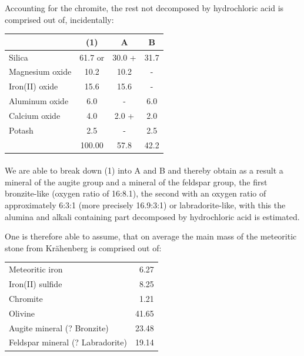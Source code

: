 \documentclass[a4paper, 12pt, oneside]{article}
\begin{document}
Accounting for the chromite, the rest not decomposed by hydrochloric acid is comprised out of, incidentally:
\begin{center}
    \begin{tabular}{ |l|c|c|c| }
        \hline
        & (1) & A & B\\\hline
        Silica & 61.7 or & 30.0 + & 31.7\\\hline
        Magnesium oxide & 10.2 & 10.2 & -\\\hline
        Iron(II) oxide & 15.6 & 15.6 & -\\\hline
        Aluminum oxide & 6.0 & - & 6.0\\\hline
        Calcium oxide & 4.0 & 2.0 + & 2.0\\\hline
        Potash & 2.5 & - & 2.5\\\hline
        & 100.00 & 57.8 & 42.2\\
        \hline
    \end{tabular}
\end{center}
\paragraph*{}
We are able to break down (1) into A and B and thereby obtain as a result a mineral of the augite group and a mineral of the feldspar group, the first bronzite-like (oxygen ratio of 16:8.1), the second with an oxygen ratio of approximately 6:3:1 (more precisely 16.9:3:1) or labradorite-like, with this the alumina and alkali containing part decomposed by hydrochloric acid is estimated.

One is therefore able to assume, that on average the main mass of the meteoritic stone from Krähenberg is comprised out of:
\begin{center}
    \begin{tabular}{l r}
        Meteoritic iron & 6.27\\
        Iron(II) sulfide & 8.25\\
        Chromite & 1.21\\
        Olivine & 41.65\\
        Augite mineral (? Bronzite) & 23.48\\
        Feldspar mineral (? Labradorite) & 19.14\\
    \end{tabular}
\end{center}
\end{document}
